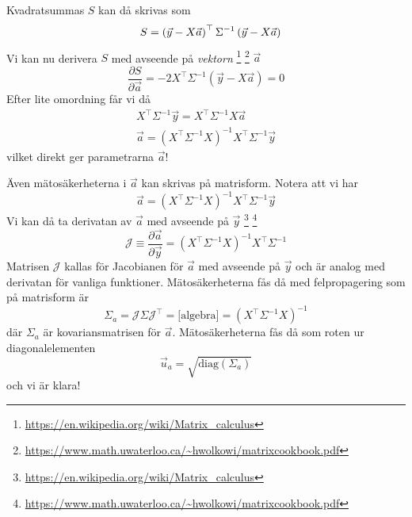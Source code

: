 \documentclass[9pt]{beamer}
\begin{document}
    \begin{frame}
        Kvadratsummas $S$ kan då skrivas som
        \begin{equation*}
            \quad S = \left(\vec y - X \vec a\right)^\top\Sigma^{-1}\left(\vec y - X \vec a\right)\\
        \end{equation*}
        Vi kan nu derivera $S$ med avseende på \emph{vektorn}%
        \footnote{\url{https://en.wikipedia.org/wiki/Matrix_calculus}}%
        \footnote{\url{https://www.math.uwaterloo.ca/~hwolkowi/matrixcookbook.pdf}}
         $\vec a$
        \begin{equation*}
            \frac{\partial S}{\partial \vec a} = -2X^\top\Sigma^{-1}\left(\vec y - X\vec a\right) = 0
        \end{equation*}
        Efter lite omordning får vi då
        \begin{gather*}
            X^\top\Sigma^{-1} \vec y = X^\top\Sigma^{-1} X \vec a\\
            \vec a = \left(X^\top \Sigma^{-1} X\right)^{-1}X^\top \Sigma^{-1} \vec y
        \end{gather*}
        vilket direkt ger parametrarna $\vec a$!
    \end{frame}

    \begin{frame}
        Även mätosäkerheterna i $\vec a$ kan skrivas på matrisform. Notera att vi har
        \begin{equation*}
            \vec a = \left(X^\top \Sigma^{-1} X\right)^{-1}X^\top \Sigma^{-1} \vec y
        \end{equation*}
        Vi kan då ta derivatan av $\vec a$ med avseende på $\vec y$%
        \footnote{\url{https://en.wikipedia.org/wiki/Matrix_calculus}}%
        \footnote{\url{https://www.math.uwaterloo.ca/~hwolkowi/matrixcookbook.pdf}}
        \begin{equation*}
            \mathcal J \equiv \frac{\partial \vec a}{\partial \vec y} = \left(X^\top \Sigma^{-1} X\right)^{-1}X^\top \Sigma^{-1}
        \end{equation*}
        Matrisen $\mathcal J$ kallas för Jacobianen för $\vec a$ med avseende på $\vec y$ och är analog med derivatan för vanliga funktioner. Mätosäkerheterna fås då med felpropagering som på matrisform är
        \begin{equation*}
            \Sigma_a = \mathcal J \Sigma \mathcal J^\top = \text{[algebra]} = \left(X^\top\Sigma^{-1}X\right)^{-1}
        \end{equation*}
        där $\Sigma_a$ är kovariansmatrisen för $\vec a$. Mätosäkerheterna fås då som roten ur diagonalelementen
        \begin{equation*}
            \vec u_a = \sqrt{\mathrm{diag}\left(\Sigma_a\right)}
        \end{equation*}
        och vi är klara!
    \end{frame}
\end{document}
